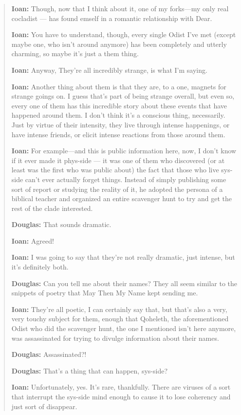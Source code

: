 \begin{quote}
\textbf{Ioan:} Though, now that I think about it, one of my forks---my only real cocladist — has found emself in a romantic relationship with Dear.

\textbf{Ioan:} You have to understand, though, every single Odist I've met (except maybe one, who isn't around anymore) has been completely and utterly charming, so maybe it's just a them thing.

\textbf{Ioan:} Anyway, They're all incredibly strange, is what I'm saying.

\textbf{Ioan:} Another thing about them is that they are, to a one, magnets for strange goings on. I guess that's part of being strange overall, but even so, every one of them has this incredible story about these events that have happened around them. I don't think it's a conscious thing, necessarily. Just by virtue of their intensity, they live through intense happenings, or have intense friends, or elicit intense reactions from those around them.

\textbf{Ioan:} For example---and this is public information here, now, I don't know if it ever made it phys-side — it was one of them who discovered (or at least was the first who was public about) the fact that those who live sys-side can't ever actually forget things. Instead of simply publishing some sort of report or studying the reality of it, he adopted the persona of a biblical teacher and organized an entire scavenger hunt to try and get the rest of the clade interested.

\textbf{Douglas:} That sounds dramatic.

\textbf{Ioan:} Agreed!

\textbf{Ioan:} I was going to say that they're not really dramatic, just intense, but it's definitely both.

\textbf{Douglas:} Can you tell me about their names? They all seem similar to the snippets of poetry that May Then My Name kept sending me.

\textbf{Ioan:} They're all poetic, I can certainly say that, but that's also a very, very touchy subject for them, enough that Qoheleth, the aforementioned Odist who did the scavenger hunt, the one I mentioned isn't here anymore, was assassinated for trying to divulge information about their names.

\textbf{Douglas:} Assassinated?!

\textbf{Douglas:} That's a thing that can happen, sys-side?

\textbf{Ioan:} Unfortunately, yes. It's rare, thankfully. There are viruses of a sort that interrupt the sys-side mind enough to cause it to lose coherency and just sort of disappear.


\end{quote}
